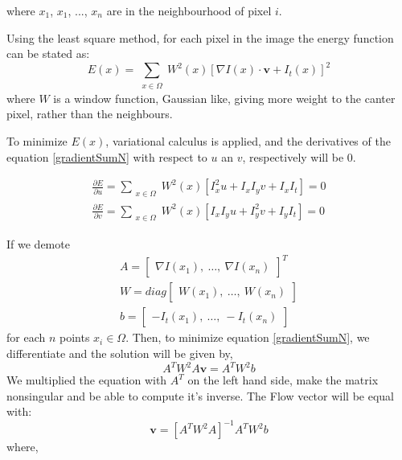 \documentclass[12pt,a4paper,twoside]{report}
\begin{document}
where $x_1$, $x_1$,  $...$,  $x_n$ are in the neighbourhood of pixel $i$.

Using the least square method, for each pixel in the image the energy function can be stated as:
\begin{equation} \label{gradientSumN}
	E(x) = \sum_{\substack{x \in \Omega}}
	 W^2(x)[\nabla I(x)\cdot \boldsymbol{v}+I_t(x)]^2
\end{equation}
where $W$ is a window function, Gaussian like, giving more weight to the canter pixel, rather than the neighbours.

To minimize $E(x)$, variational calculus is applied, and the derivatives of the equation \ref{gradientSumN} with respect to $u$ an $v$, respectively will be 0.

\begin{equation}
	\begin{split}
	\frac{\partial E}{\partial u} =  \sum_{\substack{x \in \Omega}}
	W^2(x)[I_x^2 u + I_x I_y v + I_x I_t] = 0 \\ 
	\frac{\partial E}{\partial v} =  \sum_{\substack{x \in \Omega}}
	W^2(x)[ I_x I_y u + I_y^2 v + I_y I_t]  = 0
	\end{split}
\end{equation}

If we demote
\begin{equation}
\begin{split}
A = \begin{bmatrix}
\nabla I(x_1), \ \dots , \ \nabla I(x_n)
\end{bmatrix} ^T \\
W = diag
\begin{bmatrix}
W(x_1), \ \dots , \ W(x_n)
\end{bmatrix}
\\
b = 
\begin{bmatrix}
-I_t(x_1), \ \dots, \ -I_t(x_n) 
\end{bmatrix}
\end{split}
\end{equation}
for each $n$ points $x_i \in \Omega$. Then, to minimize equation \ref{gradientSumN}, we differentiate  and the solution will be given by,
\begin{equation}
	A^T W^2 A  \boldsymbol{v} = A^T W^2 b 
\end{equation}
We multiplied the equation with $A^T$ on the left hand side, make the matrix nonsingular and be able to compute it's inverse. The Flow vector will be equal with:
\begin{equation}
\boldsymbol{v} = [A^T W^2 A  ]^{-1}A^T W^2 b
\end{equation}
where,
\end{document}
